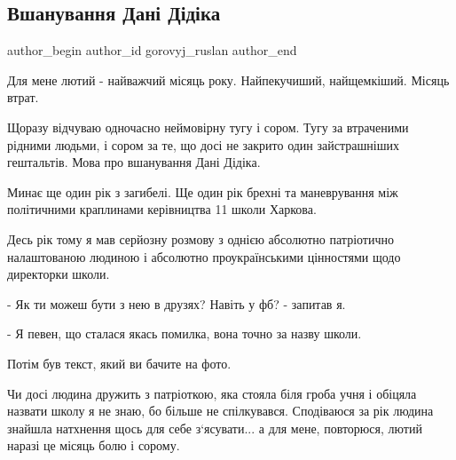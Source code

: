  
 
 
 
 
 
\subsection{Вшанування Дані Дідіка}
\label{sec:31_01_2022.fb.gorovyj_ruslan.1.vshanyvannja_dani_didyka}
 
\ifcmt
 author_begin
   author_id gorovyj_ruslan
 author_end
\fi

Для мене лютий - найважчий місяць року. Найпекучиший, найщемкіший. Місяць
втрат.

Щоразу відчуваю одночасно неймовірну тугу і сором. Тугу за втраченими рідними
людьми, і сором за те, що досі не закрито один зайстрашніших гештальтів. Мова
про вшанування Дані Дідіка.


Минає ще один рік з загибелі. Ще один рік брехні та маневрування між
політичними краплинами керівництва 11 школи Харкова. 

Десь рік тому я мав серйозну розмову з однією абсолютно патріотично
налаштованою людиною і абсолютно проукраїнськими цінностями щодо директорки
школи.

- Як ти можеш бути з нею в друзях? Навіть у фб? - запитав я.

- Я певен, що сталася якась помилка, вона точно за назву школи.

Потім був текст, який ви бачите на фото.

Чи досі людина дружить з патріоткою, яка стояла біля гроба учня і обіцяла
назвати школу я не знаю, бо більше не спілкувався. Сподіваюся за рік людина
знайшла натхнення щось для себе з‘ясувати... а для мене, повторюся, лютий наразі
це місяць болю і сорому.

